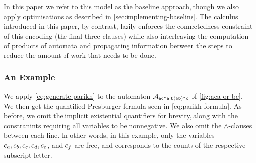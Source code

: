 \documentclass[acmsmall,review,anonymous,screen]{acmart}\settopmatter{printfolios=true,printccs=false,printacmref=true}
\theoremstyle{definition}
\begin{document}
In this paper we refer to this model as the baseline approach, though we also
apply optimisations as described in \cref{sec:implementing-baseline}. The
calculus introduced in this paper, by contrast, lazily enforces the
connectedness constraint of this encoding (the final three clauses) while also
interleaving the computation of products of automata and propagating information
between the steps to reduce the amount of work that needs to be done.

\subsubsection{An Example}
We apply \eqref{eq:generate-parikh} to the automaton $\mathcal{A}_{\mathtt{ac^*a|b(bb)^*c}}{}$ of \cref{fig:aca-or-bc}. We then get the quantified Presburger formula seen in \eqref{eq:parikh-formula}. As before, we omit the implicit existential quantifiers for brevity, along with the constranints requiring all variables to be nonnegative. We also omit the $\land$-clauses between each line. In other words, in this example, only the variables $c_a, c_b, c_c, c_d, c_e$, and $c_f$ are free, and corresponds to the counts of the respective subscript letter.
\end{document}
